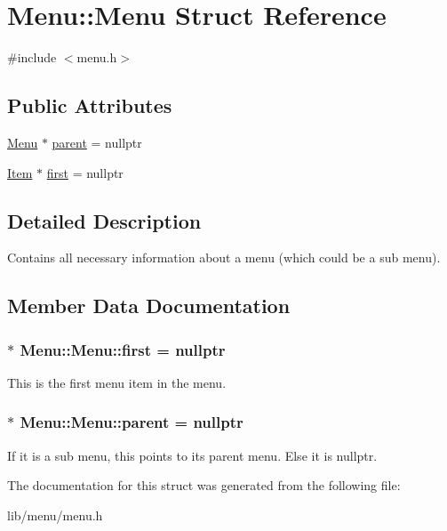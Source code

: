 \hypertarget{struct_menu_1_1_menu}{}\section{Menu\+:\+:Menu Struct Reference}
\label{struct_menu_1_1_menu}


{\ttfamily \#include $<$menu.\+h$>$}

\subsection*{Public Attributes}
\begin{DoxyCompactItemize}
\item 
\hyperlink{struct_menu_1_1_menu}{Menu} $\ast$ \hyperlink{struct_menu_1_1_menu_accedb5340f42f80cf0876b4d1e4df512}{parent} = nullptr
\item 
\hyperlink{struct_menu_1_1_item}{Item} $\ast$ \hyperlink{struct_menu_1_1_menu_aa9cb1f287490ac21ebac38e997c21af0}{first} = nullptr
\end{DoxyCompactItemize}


\subsection{Detailed Description}
Contains all necessary information about a menu (which could be a sub menu). 

\subsection{Member Data Documentation}
\subsubsection[{\texorpdfstring{first}{first}}]{$\ast$ Menu\+::\+Menu\+::first = nullptr}\hypertarget{struct_menu_1_1_menu_aa9cb1f287490ac21ebac38e997c21af0}{}\label{struct_menu_1_1_menu_aa9cb1f287490ac21ebac38e997c21af0}
This is the first menu item in the menu. 
\subsubsection[{\texorpdfstring{parent}{parent}}]{$\ast$ Menu\+::\+Menu\+::parent = nullptr}\hypertarget{struct_menu_1_1_menu_accedb5340f42f80cf0876b4d1e4df512}{}\label{struct_menu_1_1_menu_accedb5340f42f80cf0876b4d1e4df512}
If it is a sub menu, this points to its parent menu. Else it is nullptr. 

The documentation for this struct was generated from the following file\+:\begin{DoxyCompactItemize}
\item 
lib/menu/menu.\+h\end{DoxyCompactItemize}
